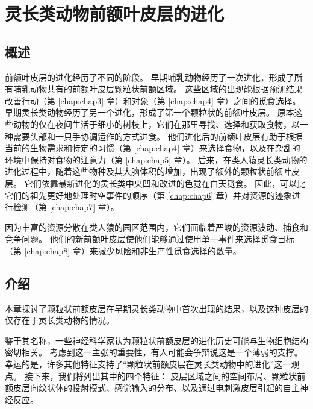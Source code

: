 \chapter{灵长类动物前额叶皮层的进化} \label{chap:chap2}


\section{概述}
前额叶皮层的进化经历了不同的阶段。
早期哺乳动物经历了一次进化，形成了所有哺乳动物共有的前额叶皮层颗粒状前额区域。
这些区域的出现能根据预测结果改善行动（第 \ref{chap:chap3} 章）和对象（第 \ref{chap:chap4} 章）之间的觅食选择。
早期灵长类动物经历了另一个进化，形成了第一个颗粒状的前额叶皮层。
原本这些动物的仅在夜间生活于细小的树枝上，它们在那里寻找、选择和获取食物，以一种需要头部和一只手协调运作的方式进食。
他们进化后的前额叶皮层有助于根据当前的生物需求和特定的习惯（第 \ref{chap:chap4} 章）来选择食物，以及在杂乱的环境中保持对食物的注意力（第 \ref{chap:chap5} 章）。
后来，在类人猿灵长类动物的进化过程中，随着这些物种及其大脑体积的增加，出现了额外的颗粒状前额叶皮层。
它们依靠最新进化的灵长类中央凹和改进的色觉在白天觅食。
因此，可以比它们的祖先更好地处理时空事件的顺序（第 \ref{chap:chap6} 章）并对资源的迹象进行检测（第 \ref{chap:chap7} 章）。\begin{flushright}
\end{flushright}
因为丰富的资源分散在类人猿的园区范围内，它们面临着严峻的资源波动、捕食和竞争问题。
他们的新前额叶皮层使他们能够通过使用单一事件来选择觅食目标（第 \ref{chap:chap8} 章）来减少风险和非生产性觅食选择的数量。









\section{介绍}

本章探讨了颗粒状前额皮层在早期灵长类动物中首次出现的结果，以及这种皮层的仅存在于灵长类动物的情况\cite{preuss2007evolutionary}。


鉴于其名称，一些神经科学家认为颗粒状前额皮层的进化历史可能与生物细胞结构密切相关。
考虑到这一主张的重要性，有人可能会争辩说这是一个薄弱的支撑。
幸运的是，许多其他特征支持了“颗粒状前额皮层在灵长类动物中的进化”这一观点。
接下来，我们将列出其中的四个特征：
皮层区域之间的空间布局、颗粒状前额皮层向纹状体的投射模式、感觉输入的分布、以及通过电刺激皮层引起的自主神经反应。





